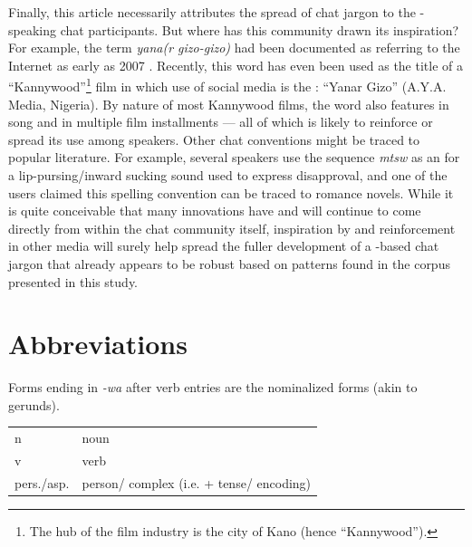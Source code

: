 \documentclass[output=paper
,newtxmath
,modfonts
,nonflat]{langsci/langscibook}
\begin{document}
Finally, this article necessarily attributes the spread of  chat jargon to the -speaking chat participants. But where has this community drawn its inspiration? For example, the term \textit{yana(r gizo-gizo)} had been documented as referring to the Internet as early as 2007 \citep{newman2007}. Recently, this word has even been used as the title of a “Kannywood”\footnote{The hub of the  film industry is the city of Kano (hence “Kannywood”).} film in which use of social media is the : “Yanar Gizo” (A.Y.A. Media, Nigeria). By nature of most Kannywood films, the word also features in song and in multiple film installments — all of which is likely to reinforce or spread its use among  speakers. Other chat conventions might be traced to popular  literature. For example, several speakers use the sequence \textit{mtsw} as an  for a lip-pursing/inward sucking sound used to express disapproval, and one of the users claimed this spelling convention can be traced to  romance novels. While it is quite conceivable that many innovations have and will continue to come directly from within the chat community itself, inspiration by and reinforcement in other media will surely help spread the fuller development of a -based chat jargon that already appears to be robust based on patterns found in the corpus presented in this study. 

\section*{Abbreviations}
Forms ending in \textit{{}-wa} after verb entries are the nominalized forms (akin to gerunds).

\noindent\begin{tabularx}{\textwidth}{@{}lQ@{}}
n & noun\\
v & verb\\ 
pers./asp.& person/ complex (i.e.  + tense/ encoding)
\end{tabularx}
\end{document}
